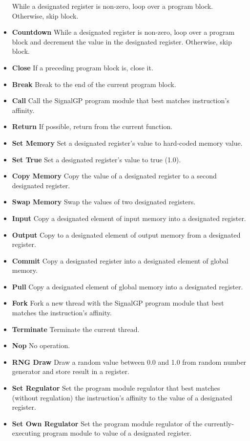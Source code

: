 \begin{itemize}
While a designated register is non-zero, loop over a program block.
Otherwise, skip block.
\item \textbf{Countdown}
While a designated register is non-zero, loop over a program block and decrement the value in the designated register.
Otherwise, skip block.
\item \textbf{Close}
If a preceding program block is, close it.
\item \textbf{Break}
Break to the end of the current program block.
\item \textbf{Call}
Call the SignalGP program module that best matches instruction's affinity.
\item \textbf{Return}
If possible, return from the current function.
\item \textbf{Set Memory}
Set a designated register's value to hard-coded memory value.
\item \textbf{Set True}
Set a designated register's value to true (1.0).
\item \textbf{Copy Memory}
Copy the value of a designated register to a second designated register.
\item \textbf{Swap Memory}
Swap the values of two designated registers.
\item \textbf{Input}
Copy a designated element of input memory into a designated register.
\item \textbf{Output}
Copy to a designated element of output memory from a designated register.
\item \textbf{Commit}
Copy a designated register into a designated element of global memory.
\item \textbf{Pull}
Copy a designated element of global memory into a designated register.
\item \textbf{Fork}
Fork a new thread with the SignalGP program module that best matches the instruction's affinity.
\item \textbf{Terminate}
Terminate the current thread.
\item \textbf{Nop}
No operation.
\item \textbf{RNG Draw}
Draw a random value between 0.0 and 1.0 from random number generator and store result in a register.
\item \textbf{Set Regulator}
Set the program module regulator that best matches (without regulation) the instruction's affinity to the value of a designated register.
\item \textbf{Set Own Regulator}
Set the program module regulator of the currently-executing program module to value of a designated register.

\end{itemize}
